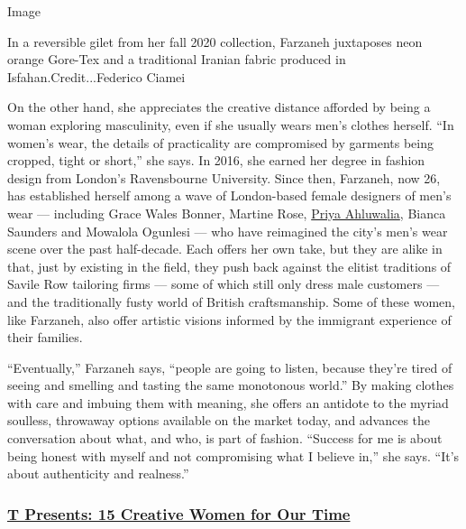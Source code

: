 Image

In a reversible gilet from her fall 2020 collection, Farzaneh juxtaposes
neon orange Gore-Tex and a traditional Iranian fabric produced in
Isfahan.Credit...Federico Ciamei

On the other hand, she appreciates the creative distance afforded by
being a woman exploring masculinity, even if she usually wears men's
clothes herself. ``In women's wear, the details of practicality are
compromised by garments being cropped, tight or short,'' she says. In
2016, she earned her degree in fashion design from London's Ravensbourne
University. Since then, Farzaneh, now 26, has established herself among
a wave of London-based female designers of men's wear --- including
Grace Wales Bonner, Martine Rose,
\href{https://www.nytimes3xbfgragh.onion/2020/08/10/t-magazine/priya-ahluwalia-fashion-menswear.html}{Priya
Ahluwalia}, Bianca Saunders and Mowalola Ogunlesi --- who have
reimagined the city's men's wear scene over the past half-decade. Each
offers her own take, but they are alike in that, just by existing in the
field, they push back against the elitist traditions of Savile Row
tailoring firms --- some of which still only dress male customers ---
and the traditionally fusty world of British craftsmanship. Some of
these women, like Farzaneh, also offer artistic visions informed by the
immigrant experience of their families.

``Eventually,'' Farzaneh says, ``people are going to listen, because
they're tired of seeing and smelling and tasting the same monotonous
world.'' By making clothes with care and imbuing them with meaning, she
offers an antidote to the myriad soulless, throwaway options available
on the market today, and advances the conversation about what, and who,
is part of fashion. ``Success for me is about being honest with myself
and not compromising what I believe in,'' she says. ``It's about
authenticity and realness.''

\hypertarget{t-presents-15-creative-women-for-our-time}{%
\subsubsection{\texorpdfstring{\href{https://www.nytimes3xbfgragh.onion/interactive/2020/08/10/t-magazine/creative-women-designers-artists-chefs.html}{T
Presents: 15 Creative Women for Our
Time}}{T Presents: 15 Creative Women for Our Time}}\label{t-presents-15-creative-women-for-our-time}}

\href{https://www.nytimes3xbfgragh.onion/section/t-magazine}{}

